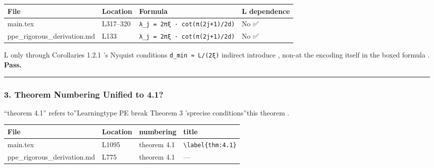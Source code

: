 \documentclass[
  12pt,
]{article}
\begin{document}
\begin{longtable}[]{@{}
  >{\raggedright\arraybackslash}p{}
  >{\raggedright\arraybackslash}p{}
  >{\raggedright\arraybackslash}p{}
  >{\raggedright\arraybackslash}p{}@{}}
\toprule\noalign{}
\begin{minipage}[b]{\linewidth}\raggedright
File
\end{minipage} & \begin{minipage}[b]{\linewidth}\raggedright
Location
\end{minipage} & \begin{minipage}[b]{\linewidth}\raggedright
Formula
\end{minipage} & \begin{minipage}[b]{\linewidth}\raggedright
L dependence
\end{minipage} \\
\midrule\noalign{}
\endhead
\bottomrule\noalign{}
\endlastfoot
main.tex & L317--320 & \texttt{λ\_j\ =\ 2πξ\ ·\ cot(π(2j+1)/2d)} & No
✅ \\
ppe\_rigorous\_derivation.md & L133 &
\texttt{λ\_j\ =\ 2πξ\ ·\ cot(π(2j+1)/2d)} & No ✅ \\
\end{longtable}

L only through Corollaries 1.2.1 's Nyquist conditions \texttt{d\_min\ ≈\ L/(2ξ)}
indirect introduce , non-at the encoding itself in the boxed formula . \textbf{Pass.}

\begin{center}\rule{0.5\linewidth}{0.5pt}\end{center}

\subsubsection{3. Theorem Numbering Unified to
4.1?}\label{ux5b9aux7406ux7f16ux53f7ux662fux5426ux7edfux4e00ux4e3a-4.1}

``theorem  4.1'' refers to''Learningtype  PE break  Theorem 3 'sprecise conditions''this theorem . 

\begin{longtable}[]{@{}llll@{}}
\toprule\noalign{}
File & Location & numbering & title  \\
\midrule\noalign{}
\endhead
\bottomrule\noalign{}
\endlastfoot
main.tex & L1095 & theorem  4.1 &
\texttt{\textbackslash{}label\{thm:4.1\}} \\
ppe\_rigorous\_derivation.md & L775 & theorem  4.1 & --- \\
\end{longtable}
\end{document}
